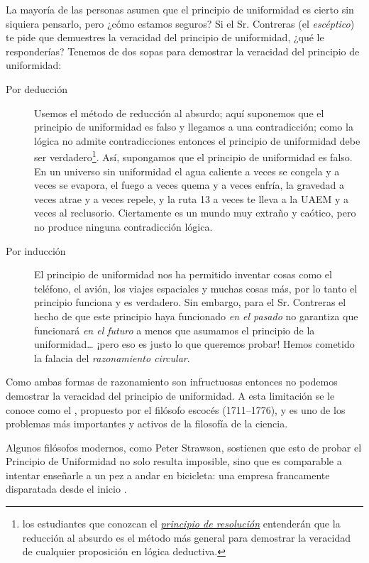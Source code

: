 La mayoría de las personas asumen que el principio de uniformidad es cierto sin siquiera pensarlo, pero ¿cómo estamos seguros?
Si el Sr. Contreras (el \emph{escéptico}) te pide que demuestres la veracidad del principio de uniformidad, ¿qué le responderías?
Tenemos de dos sopas para demostrar la veracidad del principio de uniformidad:
\begin{description}
	\item[Por deducción] Usemos el método de reducción al absurdo; aquí suponemos que el principio de uniformidad es falso y llegamos a una contradicción; como la lógica no admite contradicciones entonces el principio de uniformidad debe ser verdadero\footnote{los estudiantes que conozcan el \href{http://intrologic.stanford.edu/extras/resolution.html}{\emph{principio de resolución}} entenderán que la reducción al absurdo es el método más general para demostrar la veracidad de cualquier proposición en lógica deductiva. }.
	      Así, supongamos que el principio de uniformidad es falso.
	      En un universo sin uniformidad el agua caliente a veces se congela y a veces se evapora, el fuego a veces quema y a veces enfría, la gravedad a veces atrae y a veces repele, y la ruta 13 a veces te lleva a la UAEM y a veces al reclusorio.
	      Ciertamente es un mundo muy extraño y caótico, pero no produce ninguna contradicción lógica.
	\item[Por inducción] El principio de uniformidad nos ha permitido inventar cosas como el teléfono, el avión, los viajes espaciales y muchas cosas más, por lo tanto el principio funciona y es verdadero.
	      Sin embargo, para el Sr. Contreras el hecho de que este principio haya funcionado \emph{en el pasado} no garantiza que funcionará \emph{en el futuro} a menos que asumamos el principio de la uniformidad… ¡pero eso es justo lo que queremos probar!
	      Hemos cometido la falacia del \emph{razonamiento circular}.
\end{description} Como ambas formas de razonamiento son infructuosas entonces no podemos demostrar la veracidad del principio de uniformidad.
A esta limitación se le conoce como el , propuesto por el filósofo escocés  (1711--1776), y es uno de los problemas más importantes y activos de la filosofía de la ciencia.

Algunos filósofos modernos, como Peter Strawson, sostienen que esto de probar el Principio de Uniformidad no solo resulta imposible, sino que es comparable a intentar enseñarle a un pez a andar en bicicleta: una empresa francamente disparatada desde el inicio \cite{Strawson2012}.

